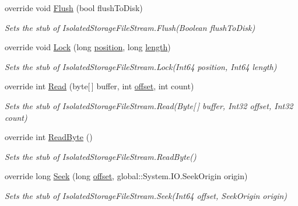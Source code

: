 \begin{DoxyCompactItemize}
override void \hyperlink{class_system_1_1_i_o_1_1_isolated_storage_1_1_fakes_1_1_stub_isolated_storage_file_stream_a5a5749ce50ea236363872335fcd896fb}{Flush} (bool flush\-To\-Disk)
\begin{DoxyCompactList}\small\item\em Sets the stub of Isolated\-Storage\-File\-Stream.\-Flush(\-Boolean flush\-To\-Disk)\end{DoxyCompactList}\item 
override void \hyperlink{class_system_1_1_i_o_1_1_isolated_storage_1_1_fakes_1_1_stub_isolated_storage_file_stream_ab235687714239cd125795634eff5a29e}{Lock} (long \hyperlink{jquery-1_810_82-vsdoc_8js_a0a2a38b3281bb5c9cf0c479a04b513cb}{position}, long \hyperlink{jquery-1_810_82-vsdoc_8js_aa7de35d58da66d9944ab9cbe82c19640}{length})
\begin{DoxyCompactList}\small\item\em Sets the stub of Isolated\-Storage\-File\-Stream.\-Lock(\-Int64 position, Int64 length)\end{DoxyCompactList}\item 
override int \hyperlink{class_system_1_1_i_o_1_1_isolated_storage_1_1_fakes_1_1_stub_isolated_storage_file_stream_ab81c5ef8ff1540c5fa3cd5f1fcd976dc}{Read} (byte\mbox{[}$\,$\mbox{]} buffer, int \hyperlink{jquery-1_810_82_8js_a4a9f594d20d927164551fc7fa4751a2f}{offset}, int count)
\begin{DoxyCompactList}\small\item\em Sets the stub of Isolated\-Storage\-File\-Stream.\-Read(\-Byte\mbox{[}$\,$\mbox{]} buffer, Int32 offset, Int32 count)\end{DoxyCompactList}\item 
override int \hyperlink{class_system_1_1_i_o_1_1_isolated_storage_1_1_fakes_1_1_stub_isolated_storage_file_stream_a00ad61e8698c92f2db9a07563e3516c5}{Read\-Byte} ()
\begin{DoxyCompactList}\small\item\em Sets the stub of Isolated\-Storage\-File\-Stream.\-Read\-Byte()\end{DoxyCompactList}\item 
override long \hyperlink{class_system_1_1_i_o_1_1_isolated_storage_1_1_fakes_1_1_stub_isolated_storage_file_stream_a33f62db5ea6e856be9a8e2c701e84936}{Seek} (long \hyperlink{jquery-1_810_82_8js_a4a9f594d20d927164551fc7fa4751a2f}{offset}, global\-::\-System.\-I\-O.\-Seek\-Origin origin)
\begin{DoxyCompactList}\small\item\em Sets the stub of Isolated\-Storage\-File\-Stream.\-Seek(\-Int64 offset, Seek\-Origin origin)\end{DoxyCompactList}\item 

\end{DoxyCompactItemize}
